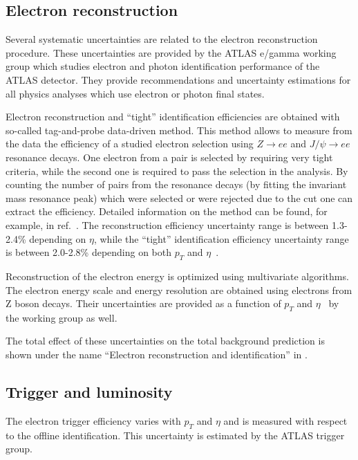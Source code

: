 \subsection{Electron reconstruction}
\label{subsec:elec_reco_system}
Several systematic uncertainties are related to the electron reconstruction procedure.
These uncertainties are provided by the ATLAS e/gamma working group which studies electron and photon identification performance of the ATLAS detector.
They provide recommendations and uncertainty estimations for all physics analyses which use electron or photon final states.

Electron reconstruction and ``tight'' identification efficiencies are obtained with so-called tag-and-probe data-driven method.
This method allows to measure from the data the efficiency of a studied electron selection using $Z \to e e$ and $J/\psi \to e e$ resonance decays. 
One electron from a pair is selected by requiring very tight criteria, 
while the second one is required to pass the selection in the analysis.
By counting the number of pairs from the resonance decays (by fitting the invariant mass resonance peak) which were selected or were rejected due to the cut one can extract the efficiency. Detailed information on the method can be found, for example, in ref.~\cite{tag-and-probe}.
The reconstruction efficiency uncertainty range is between 1.3-2.4\% depending on $\eta$, while the 
``tight'' identification efficiency uncertainty range is between 2.0-2.8\% depending on both $p_T$ and $\eta$~\cite{electron_reco_id_2011}.

Reconstruction of the electron energy is optimized using multivariate algorithms.
The electron energy scale and energy resolution are obtained using electrons from Z boson decays.
Their uncertainties are provided as a function of $p_T$ and $\eta$~\cite{electron_energy_errors_Run1} 
by the working group as well.

The total effect of these uncertainties on the total background prediction 
is shown under the name ``Electron reconstruction and identification'' in .

\subsection{Trigger and luminosity}
The electron trigger efficiency varies with $p_T$ and $\eta$ and is measured with respect to the offline identification. This uncertainty is estimated by the ATLAS trigger group.

